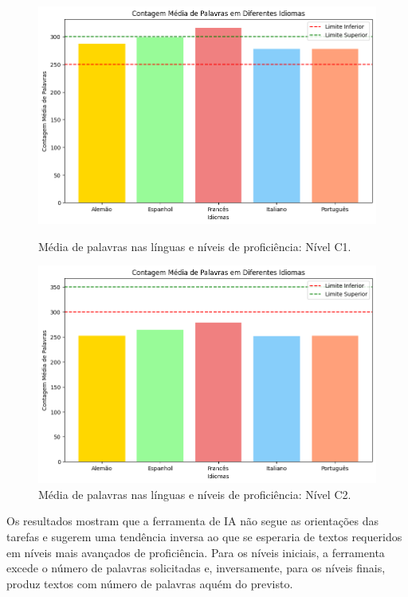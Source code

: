 \documentclass[portuguese]{textolivre}
\begin{document}
\begin{figure}[p]
 \centering
 \begin{minipage}{.47\textwidth}
 \includegraphics[width=\textwidth]{Fig5.png}
 \caption{Média de palavras nas línguas e níveis de proficiência: Nível C1.}
 \label{fig5}
 \end{minipage}%
 \qquad
 \begin{minipage}{0.47\textwidth}
 \includegraphics[width=\textwidth]{Fig6.png}
 \caption{Média de palavras nas línguas e níveis de proficiência: Nível C2.}
 \label{fig6} 
 \end{minipage}%
\end{figure}

Os resultados mostram que a ferramenta de IA não segue as orientações das tarefas e sugerem uma tendência inversa ao que se esperaria de textos requeridos em níveis mais avançados de proficiência. Para os níveis iniciais, a ferramenta excede o número de palavras solicitadas e, inversamente, para os níveis finais, produz textos com número de palavras aquém do previsto.
\end{document}
